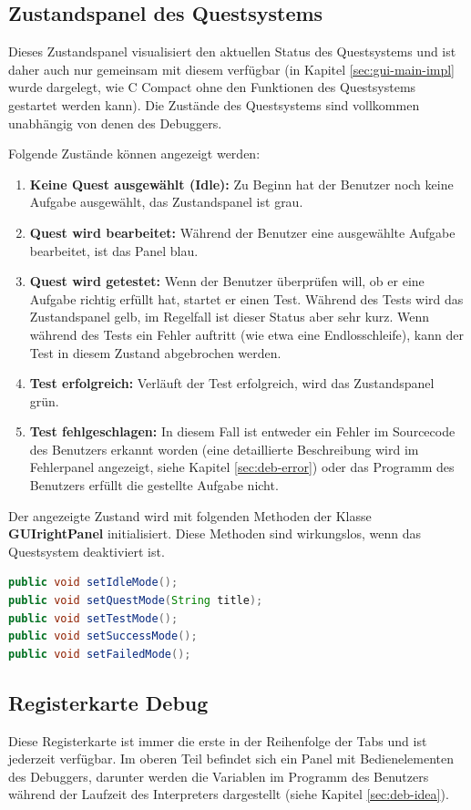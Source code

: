 \subsection{Zustandspanel des Questsystems}
Dieses Zustandspanel visualisiert den aktuellen Status des Questsystems und ist daher auch nur gemeinsam mit diesem verfügbar (in Kapitel \ref{sec:gui-main-impl} wurde dargelegt, wie C Compact ohne den Funktionen des Questsystems gestartet werden kann). Die Zustände des Questsystems sind vollkommen unabhängig von denen des Debuggers.

Folgende Zustände können angezeigt werden:
\begin{enumerate}
\item \textbf{Keine Quest ausgewählt (Idle):} Zu Beginn hat der Benutzer noch keine Aufgabe ausgewählt, das Zustandspanel ist grau.
\item \textbf{Quest wird bearbeitet:} Während der Benutzer eine ausgewählte Aufgabe bearbeitet, ist das Panel blau.
\item \textbf{Quest wird getestet:} Wenn der Benutzer überprüfen will, ob er eine Aufgabe richtig erfüllt hat, startet er einen Test. Während des Tests wird das Zustandspanel gelb, im Regelfall ist dieser Status aber sehr kurz. Wenn während des Tests ein Fehler auftritt (wie etwa eine Endlosschleife), kann der Test in diesem Zustand abgebrochen werden.
\item \textbf{Test erfolgreich:} Verläuft der Test erfolgreich, wird das Zustandspanel grün.
\item \textbf{Test fehlgeschlagen:} In diesem Fall ist entweder ein Fehler im Sourcecode des Benutzers erkannt worden (eine detaillierte Beschreibung wird im Fehlerpanel angezeigt, siehe Kapitel \ref{sec:deb-error}) oder das Programm des Benutzers erfüllt die gestellte Aufgabe nicht.
\end{enumerate}

Der angezeigte Zustand wird mit folgenden Methoden der Klasse \textbf{GUIrightPanel} initialisiert. Diese Methoden sind wirkungslos, wenn das Questsystem deaktiviert ist.
\begin{lstlisting}[language=JAVA]
public void setIdleMode();
public void setQuestMode(String title);
public void setTestMode();
public void setSuccessMode();
public void setFailedMode();
\end{lstlisting}

\subsection{Registerkarte \glqq{}Debug\grqq{}}
\label{sec:gui-main-right-reg-deb}
Diese Registerkarte ist immer die erste in der Reihenfolge der Tabs und ist jederzeit verfügbar. Im oberen Teil befindet sich ein Panel mit Bedienelementen des Debuggers, darunter werden die Variablen im Programm des Benutzers während der Laufzeit des Interpreters dargestellt (siehe Kapitel \ref{sec:deb-idea}).

